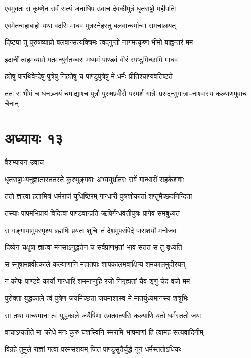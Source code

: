 \twolineshloka
{एवमुक्तः स कृष्णेन सर्वं सत्यं जनाधिप}
{उवाच देवकीपुत्रं धृतराष्ट्रो महीपतिः}


\twolineshloka
{एवमेतन्महाबाहो यथा वदसि माधव}
{पुत्रस्नेहस्तु बलवान्धर्मान्मां समचालयत्}


\twolineshloka
{दिष्ट्या तु पुरुषव्याघ्रो बलवान्सत्यक्त्रिमः}
{त्वद्गुप्तो नागमत्कृष्ण भीमो बाह्वन्तरं मम}


\twolineshloka
{इदानीं त्वहमव्यग्रो गतमन्युर्गतज्वरः}
{मध्यमं पाण्डवं वीरं स्पष्टुमिच्छामि माधव}


\twolineshloka
{हतेषु पारथिवेन्द्रेषु पुत्रेषु निहतेषु च}
{पाण्डुपुत्रेषु मे धर्मः प्रीतिश्चाप्यवतिष्ठते}


\twolineshloka
{ततः स भीमं च धनञ्जयं चमाद्याश्च पुत्रौ पुरुषप्रवीरौ}
{पस्पर्श गात्रैः प्ररुदन्सुगात्रा--नाश्वास्य कल्याणमुवाच चैनान्}


\chapter{अध्यायः १३}
\twolineshloka
{वैशम्पायन उवाच}
{}


\twolineshloka
{धृतराष्ट्राभ्यनुज्ञातास्ततस्ते कुरुपुङ्गवाः}
{अभ्ययुर्भ्रातरः सर्वे गान्धारीं सहकेशवाः}


\twolineshloka
{ततो ज्ञात्वा हतामित्रं धर्मराजं युधिष्ठिरम्}
{गान्धारी पुत्रशोकार्ता शप्तुमैच्छदनिन्दिता}


\twolineshloka
{तस्याः पापमभिप्रायं विदित्वा पाण्डवान्प्रति}
{ऋषिर्गन्धवतीपुत्रः प्रागेव समबुध्यत}


\twolineshloka
{स गङ्गायामुपस्पृश्य ब्रह्मर्षिः प्रयतः शुचिः}
{तं देशमुपसंपेदे पाराशर्यो मनोजवः}


\twolineshloka
{दिव्येन चक्षुषा ज्ञात्वा मनसाऽनुद्धतेन च}
{सर्वप्राणभृतां भावं सततं स तु बृध्यति}


\twolineshloka
{स स्नुषामब्रवीत्काले कल्याणानि महातपाः}
{शापकालमवाक्षिप्य शमकालमुदीरयन्}


\twolineshloka
{न कोपः पाण्डवे कार्यो गान्धारि शममाप्नुहि}
{रजो निगृह्यतां चैव शृणु चेदं वचो मम}


\twolineshloka
{पुरोक्ता युद्धकाले त्वं पुत्रेण जयमिच्छता}
{जयमाशास्व मे मातर्युध्यमानस्य शत्रुभिः}


\twolineshloka
{सा तथा याच्यमाना त्वं युद्धकाले जयैषिणा}
{उक्तवत्यसि कल्याणि यतो धर्मस्ततो जयः}


\twolineshloka
{वाचाऽप्यतीते मा क्रोधे मनः कुरु यशस्विनि}
{स्मरामि भाषमाणां हि त्वामहं सत्यवादिनीम्}


\twolineshloka
{विग्रहे तुमुले राज्ञां गत्वा परमसंशयम्}
{जितं पाण्डुसुतैर्युद्धे नूनं धर्मस्ततोऽधिकः}


